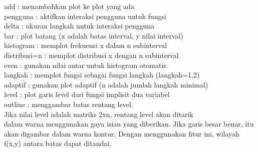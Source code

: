 \documentclass{article}
\begin{document}
\begin{eulernotebook}
\begin{eulercomment}
\begin{eulercomment}
\begin{eulercomment}
\begin{eulercomment}
\begin{eulercomment}
\begin{eulercomment}
\begin{eulercomment}
\begin{eulercomment}
\begin{eulercomment}
\begin{eulercomment}
\begin{eulercomment}
\begin{eulercomment}
\begin{eulercomment}
\begin{eulercomment}
\begin{eulercomment}
\begin{eulercomment}
\begin{eulercomment}
\begin{eulercomment}
\begin{eulercomment}
\begin{eulercomment}
\begin{eulercomment}
\begin{eulercomment}
\begin{eulercomment}
\begin{eulercomment}
\begin{eulercomment}
\begin{eulercomment}
\begin{eulercomment}
\begin{eulercomment}
\begin{eulercomment}
add          : menambahkan plot ke plot yang ada\\
pengguna     : aktifkan interaksi pengguna untuk fungsi\\
delta        : ukuran langkah untuk interaksi pengguna\\
bar          : plot batang (x adalah batas interval, y nilai interval)\\
histogram    : memplot frekuensi x dalam n subinterval\\
distribusi=n : memplot distribusi x dengan n subinterval\\
even         : gunakan nilai antar untuk histogram otomatis.\\
langkah      : memplot fungsi sebagai fungsi langkah (langkah=1,2)\\
adaptif      : gunakan plot adaptif (n adalah jumlah langkah minimal)\\
level        : plot garis level dari fungsi implisit dua variabel\\
outline      : menggambar batas rentang level.\\
Jika nilai level adalah matriks 2xn, rentang level akan ditarik\\
dalam warna menggunakan gaya isian yang diberikan. Jika garis besar
benar, itu\\
akan digambar dalam warna kontur. Dengan menggunakan fitur ini,
wilayah\\
f(x,y) antara batas dapat ditandai.


\end{eulercomment}
\end{eulercomment}
\end{eulercomment}
\end{eulercomment}
\end{eulercomment}
\end{eulercomment}
\end{eulercomment}
\end{eulercomment}
\end{eulercomment}
\end{eulercomment}
\end{eulercomment}
\end{eulercomment}
\end{eulercomment}
\end{eulercomment}
\end{eulercomment}
\end{eulercomment}
\end{eulercomment}
\end{eulercomment}
\end{eulercomment}
\end{eulercomment}
\end{eulercomment}
\end{eulercomment}
\end{eulercomment}
\end{eulercomment}
\end{eulercomment}
\end{eulercomment}
\end{eulercomment}
\end{eulercomment}
\end{eulercomment}
\end{eulernotebook}
\end{document}
